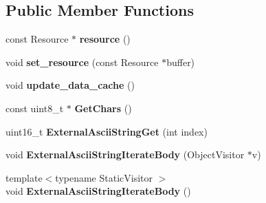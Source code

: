 \subsection*{Public Member Functions}
\begin{DoxyCompactItemize}
\item 
\hypertarget{classv8_1_1internal_1_1_external_ascii_string_a69ee4d00b6ee691bffcbe4ed3ecfabe4}{}const Resource $\ast$ {\bfseries resource} ()\label{classv8_1_1internal_1_1_external_ascii_string_a69ee4d00b6ee691bffcbe4ed3ecfabe4}

\item 
\hypertarget{classv8_1_1internal_1_1_external_ascii_string_ae0b1e7ddb1532e834b97ebb112222d33}{}void {\bfseries set\+\_\+resource} (const Resource $\ast$buffer)\label{classv8_1_1internal_1_1_external_ascii_string_ae0b1e7ddb1532e834b97ebb112222d33}

\item 
\hypertarget{classv8_1_1internal_1_1_external_ascii_string_a7f0abd557d2a4a4232f23bd9aff34b15}{}void {\bfseries update\+\_\+data\+\_\+cache} ()\label{classv8_1_1internal_1_1_external_ascii_string_a7f0abd557d2a4a4232f23bd9aff34b15}

\item 
\hypertarget{classv8_1_1internal_1_1_external_ascii_string_a3e3feef73f29186fc1bc897f936a4021}{}const uint8\+\_\+t $\ast$ {\bfseries Get\+Chars} ()\label{classv8_1_1internal_1_1_external_ascii_string_a3e3feef73f29186fc1bc897f936a4021}

\item 
\hypertarget{classv8_1_1internal_1_1_external_ascii_string_ac2087a5aac89f6b173bc902246528fa6}{}uint16\+\_\+t {\bfseries External\+Ascii\+String\+Get} (int index)\label{classv8_1_1internal_1_1_external_ascii_string_ac2087a5aac89f6b173bc902246528fa6}

\item 
\hypertarget{classv8_1_1internal_1_1_external_ascii_string_a4d8dc9837e06a312c7faebd9f8083c7e}{}void {\bfseries External\+Ascii\+String\+Iterate\+Body} (Object\+Visitor $\ast$v)\label{classv8_1_1internal_1_1_external_ascii_string_a4d8dc9837e06a312c7faebd9f8083c7e}

\item 
\hypertarget{classv8_1_1internal_1_1_external_ascii_string_a1badfb54e13751a1bc67ac55766cb89c}{}{\footnotesize template$<$typename Static\+Visitor $>$ }\\void {\bfseries External\+Ascii\+String\+Iterate\+Body} ()\label{classv8_1_1internal_1_1_external_ascii_string_a1badfb54e13751a1bc67ac55766cb89c}

\end{DoxyCompactItemize}
